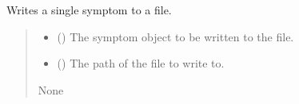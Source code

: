 \documentclass[letterpaper,10pt,english]{sphinxmanual}
\begin{document}
\begin{fulllineitems}
\label{\detokenize{frise:frise.ecriture_fichier.EcrireSymptome}}
\pysigstartsignatures
{}
\pysigstopsignatures
\sphinxAtStartPar
Writes a single symptom to a file.
\begin{quote}\begin{description}
\begin{itemize}
\item {} 
\sphinxAtStartPar
{} () \textendash{} The symptom object to be written to the file.

\item {} 
\sphinxAtStartPar
{} () \textendash{} The path of the file to write to.

\end{itemize}

\sphinxAtStartPar
None

\end{description}\end{quote}

\end{fulllineitems}

\end{document}
